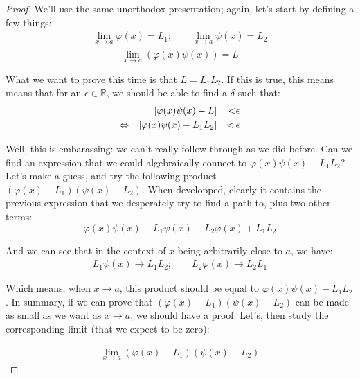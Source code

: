 \documentclass[solutions.tex]{subfiles}
\begin{document}
\begin{proof} We'll use the same unorthodox presentation; again,
let's start by defining a few things:
\begin{equation*} \begin{aligned}
	\lim_{x \rightarrow a}\varphi(x) = L_1;\qquad\lim_{x \rightarrow a}\psi(x) = L_2 \\
\end{aligned} \end{equation*}
\[	\lim_{x \rightarrow a}\left(\varphi(x)\psi(x)\right) = L \]

What we want to prove this time is that $L = L_1L_2$. If this
is true, this means means that for an $\epsilon\in\mathbb{R}$, we
should be able to find a $\delta$ such that:
\begin{equation*} \begin{aligned}
	~ && \lvert \varphi(x)\psi(x)-L \rvert &&<& \epsilon \\
	\Leftrightarrow && \lvert \varphi(x)\psi(x)-L_1L_2 \rvert &&<\,& \epsilon
\end{aligned} \end{equation*}

Well, this is embarassing: we can't really follow through as we did
before. Can we find an expression that we could algebraically connect
to $\varphi(x)\psi(x)-L_1L_2$? \\

Let's make a guess, and try the following product $(\varphi(x)-L_1)(\psi(x)-L_2)$.
When developped, clearly it contains the previous expression that
we desperately try to find a path to, plus two other terms:
\[
	\varphi(x)\psi(x)-L_1\psi(x)-L_2\varphi(x)+L_1L_2
\]

And we can see that in the context of $x$ being arbitrarily close
to $a$, we have:
\begin{equation*} \begin{aligned}
	L_1\psi(x) \rightarrow L_1L_2;\qquad L_2\varphi(x) \rightarrow L_2L_1
\end{aligned} \end{equation*}

Which means, when $x\rightarrow a$, this product should be equal to
$\varphi(x)\psi(x)-L_1L_2$. In summary, if we can prove that
$(\varphi(x)-L_1)(\psi(x)-L_2)$ can be made as small as we want as
$x\rightarrow a$, we should have a proof. Let's, then study the
corresponding limit (that we expect to be zero):

\begin{equation*} \begin{aligned}
	\lim_{x\rightarrow a}(\varphi(x)-L_1)(\psi(x)-L_2)
\end{aligned} \end{equation*}


\end{proof}
\end{document}
